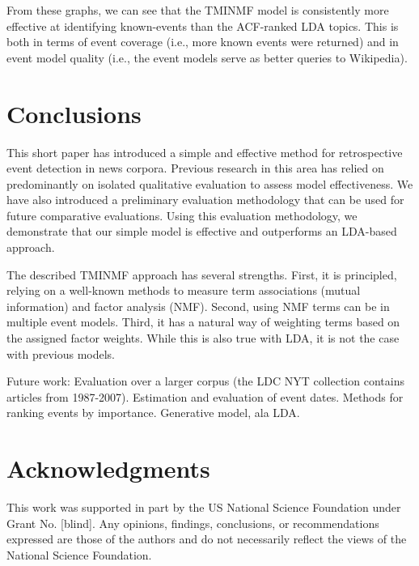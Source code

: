 \documentclass{sig-alternate}
\begin{document}
From these graphs, we can see that the TMINMF model is consistently more effective at identifying known-events than the ACF-ranked LDA topics. This is both in terms of event coverage (i.e., more known events were returned) and in event model quality (i.e., the event models serve as better queries to Wikipedia).  

\section{Conclusions}

This short paper has introduced a simple and effective method for retrospective event detection in news corpora. Previous research in this area has relied on predominantly on isolated qualitative evaluation to assess model effectiveness. We have also introduced a preliminary evaluation methodology that can be used for future comparative evaluations. Using this evaluation methodology, we demonstrate that our simple model is effective and outperforms an LDA-based approach. 

The described TMINMF approach has several strengths. First, it is principled, relying on a well-known methods to measure term associations (mutual information) and factor analysis (NMF). Second, using NMF terms can be in multiple event models.  Third, it has a natural way of weighting terms based on the assigned factor weights. While this is also true with LDA, it is not the case with previous models.  

Future work: Evaluation over a larger corpus (the LDC NYT collection contains articles from 1987-2007). Estimation and evaluation of event dates. Methods for ranking events by importance. Generative model, ala LDA.


\section{Acknowledgments}
This work was supported in part by the US National Science Foundation under Grant No. [blind]. Any opinions, findings, conclusions, or recommendations expressed are those of the authors and do not necessarily reflect the views of the National Science Foundation.



  
\end{document}
